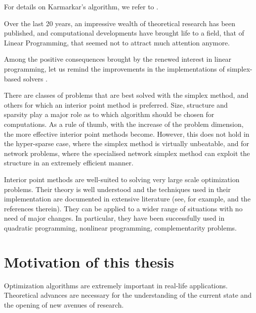 For details on Karmarkar's algorithm, we refer to
\cite[ch.6]{FangPuthenpura93}.

Over the last 20 years, an impressive wealth of theoretical research
has been published, and computational developments have brought life
to a field, that of Linear Programming, that seemed not to attract much
attention anymore.

Among the positive consequences brought by the renewed interest in linear
programming, let us remind the improvements in the implementations of 
simplex-based solvers \cite{Bixby02,Bixby94}.

There are classes of problems that are best solved with the simplex
method, and others for which an interior point method is preferred.
Size, structure and sparsity play a major role as to which
algorithm should be chosen for computations.
As a rule of thumb, with the increase of the problem dimension, the 
more effective interior point methods become.
However, this does not hold in the hyper-sparse case, where the
simplex method is virtually unbeatable, and for network problems,
where the specialised network simplex method can exploit the
structure in an extremely efficient manner.


Interior point methods are well-suited to solving very
large scale optimization problems. Their theory is well understood
\cite{ipm:Wright97} and the techniques used in their implementation 
are documented in extensive literature (see, for example, 
\cite{AndersenGondzioMeszarosXu,GondzioTerlaky} and the references therein).
They can be applied to a wider range of situations with no need
of major changes. In particular, they have been successfully used in
quadratic programming, nonlinear programming, complementarity problems.


%
%
\section{Motivation of this thesis}

Optimization algorithms are extremely important in real-life 
applications. Theoretical advances are necessary for the 
understanding of the current state and the opening of new avenues 
of research. 

